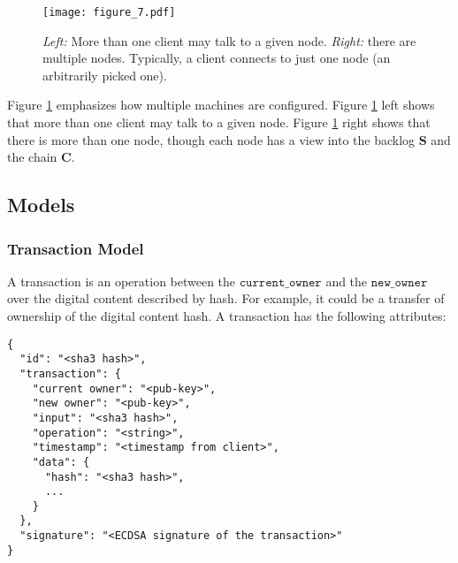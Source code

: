 \begin{figure}[!ht]
  \centering
  \texttt{[image: figure\_7.pdf]}
  \caption{\textit{Left:} More than one client may talk to a given node.
  \textit{Right:} there are multiple nodes. Typically, a client connects to just one node (an arbitrarily picked one).}
  \label{fig:bigchaindb_architecture_sharding}
\end{figure}

Figure \ref{fig:bigchaindb_architecture_sharding} emphasizes how multiple machines are configured.
Figure \ref{fig:bigchaindb_architecture_sharding} left shows that more than one client may talk to a given node.
Figure \ref{fig:bigchaindb_architecture_sharding} right shows that there is more than one node, though each node has a view into the backlog $\mathbf{S}$ and the chain $\mathbf{C}$.


\subsection{Models}\label{subsec:bigchaindb:models}
\subsubsection{Transaction Model}
A transaction is an operation between the $\mathtt{current\_owner}$ and the $\mathtt{new\_owner}$ over the digital content described by hash.
For example, it could be a transfer of ownership of the digital content hash.
A transaction has the following attributes:

\begin{lstlisting}[style=json]
{
  "id": "<sha3 hash>",
  "transaction": {
    "current owner": "<pub-key>",
    "new owner": "<pub-key>",
    "input": "<sha3 hash>",
    "operation": "<string>",
    "timestamp": "<timestamp from client>", 
    "data": {
      "hash": "<sha3 hash>",
      ...
    } 
  },
  "signature": "<ECDSA signature of the transaction>"
}
\end{lstlisting}

